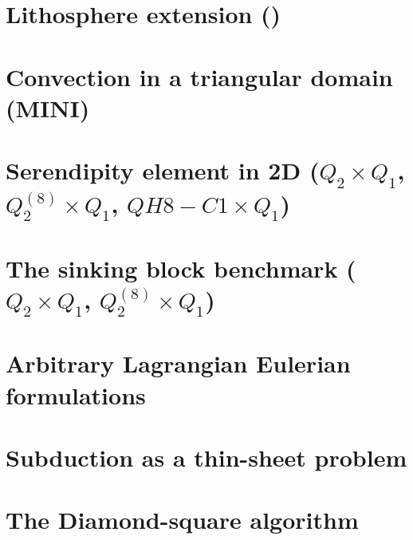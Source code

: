 \documentclass[a4paper,11pt]{report}
\begin{document}
\chapter{Lithosphere extension (\QtwoQone)\label{f50}} %

\chapter{Convection in a triangular domain (MINI)\label{f51}} %

\chapter{Serendipity element in 2D ($Q_2\times Q_1$, $Q_2^{(8)}\times Q_1$, $QH8-C1\times Q_1$) \label{f52}} %

\chapter{The sinking block benchmark ($Q_2\times Q_1$, $Q_2^{(8)}\times Q_1$) \label{f53}} %

\chapter{Arbitrary Lagrangian Eulerian formulations \label{f54}} %

\chapter{Subduction as a thin-sheet problem  \label{f55}} %

\chapter{The Diamond-square algorithm \label{f56}} %
\end{document}

